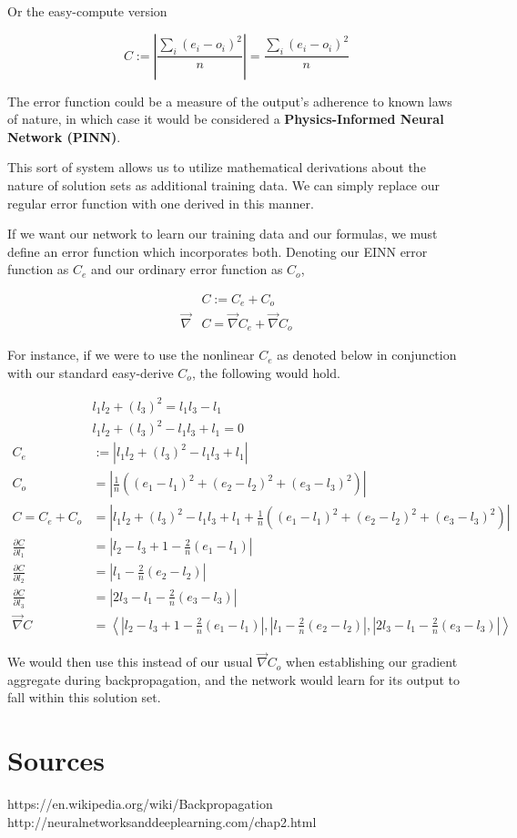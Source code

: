 \documentclass[8pt]{amsart}
\begin{document}
Or the easy-compute version

\[
    C := | \frac{\sum_i{(e_i - o_i)^2}}{n} | = \frac{\sum_i{(e_i - o_i)^2}}{n}
\]

The error function could be a measure of the output's adherence to known
laws of nature, in which case it would be considered a \textbf{Physics-Informed
Neural Network (PINN)}.

This sort of system allows us to utilize mathematical derivations about
the nature of solution sets as additional training data. We can simply replace
our regular error function with one derived in this manner.

If we want our network to learn our training data and our formulas, we must
define an error function which incorporates both. Denoting our EINN error
function as $C_e$ and our ordinary error function as $C_o$,

\[
\begin{aligned}
    &C := C_e + C_o \\
    \vec{\nabla} &C = \vec{\nabla}C_e + \vec{\nabla}C_o
\end{aligned}
\]

For instance, if we were to use the nonlinear $C_e$ as denoted below
in conjunction with our standard easy-derive $C_o$, the following would
hold.

\[
\begin{aligned}
    &l_1 l_2 + (l_3)^2 = l_1 l_3 - l_1 \\
    &l_1 l_2 + (l_3)^2 - l_1 l_3 + l_1 = 0 \\
    C_e &:= \left| l_1 l_2 + (l_3)^2 - l_1 l_3 + l_1 \right| \\
    C_o &= \left| \frac{1}{n} \left( (e_1 - l_1)^2 + (e_2 - l_2)^2 + (e_3 - l_3)^2 \right) \right| \\
    C = C_e + C_o &= \left| l_1 l_2 + (l_3)^2 - l_1 l_3 + l_1 + \frac{1}{n} \left( (e_1 - l_1)^2 + (e_2 - l_2)^2 + (e_3 - l_3)^2 \right) \right| \\
    \frac{\partial C}{\partial l_1} &= \left| l_2 - l_3 + 1 - \frac{2}{n}(e_1 - l_1) \right| \\
    \frac{\partial C}{\partial l_2} &= \left| l_1 - \frac{2}{n}(e_2 - l_2) \right| \\
    \frac{\partial C}{\partial l_3} &= \left| 2 l_3 - l_1 - \frac{2}{n}(e_3 - l_3) \right| \\
    \vec{\nabla} C &= \left< \left| l_2 - l_3 + 1 - \frac{2}{n}(e_1 - l_1) \right|, 
        \left| l_1 - \frac{2}{n}(e_2 - l_2) \right|,
        \left| 2 l_3 - l_1 - \frac{2}{n}(e_3 - l_3) \right| \right>
\end{aligned}
\]

We would then use this instead of our usual $\vec{\nabla} C_o$ when establishing
our gradient aggregate during backpropagation, and the network would learn for its
output to fall within this solution set.

\section{Sources}

https://en.wikipedia.org/wiki/Backpropagation \\
http://neuralnetworksanddeeplearning.com/chap2.html
\end{document}
